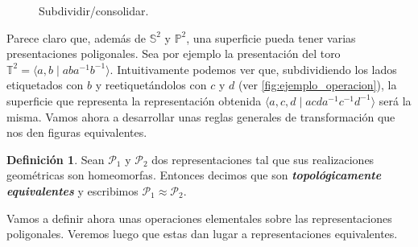 \documentclass[10pt]{report}
\newcommand{\Esfera}{\mathbb{S}^2}
\newcommand{\Toro}{\mathbb{T}^2}
\newcommand{\Proyectivo}{\mathbb{P}^2}
\newcommand{\enfatiza}[1]{\textbf{\textit{#1}}}
\theoremstyle{definition}
\newtheorem{defin}{Definición}[section]
\begin{document}
\begin{figure}[h]%
\centering
{}

\caption{Subdividir/consolidar. \label{fig:ejemplo_operacion}}
\end{figure}


Parece claro que, además de $\Esfera$ y $\Proyectivo$, una superficie pueda tener varias presentaciones poligonales. Sea por ejemplo la presentación del toro $\Toro=\langle a,b\mid aba^{-1}b^{-1}\rangle$. Intuitivamente podemos ver que, subdividiendo los lados etiquetados con $b$ y reetiquetándolos con $c$ y $d$ (ver \autoref{fig:ejemplo_operacion}), la superficie que representa la representación obtenida $\langle a,c,d\mid  acda^{-1}c^{-1}d^{-1}\rangle$ será la misma.
Vamos ahora a desarrollar unas reglas generales de transformación que nos den figuras equivalentes.



\begin{defin}%
Sean $\mathcal{P}_1$ y $\mathcal{P}_2$ dos representaciones tal que sus realizaciones geométricas son homeomorfas. Entonces decimos que son \enfatiza{topológicamente equivalentes} y escribimos $\mathcal{P}_1 \approx \mathcal{P}_2$.
\end{defin}




Vamos a definir ahora unas operaciones elementales sobre las representaciones poligonales. Veremos luego que estas dan lugar a representaciones equivalentes.
\end{document}
